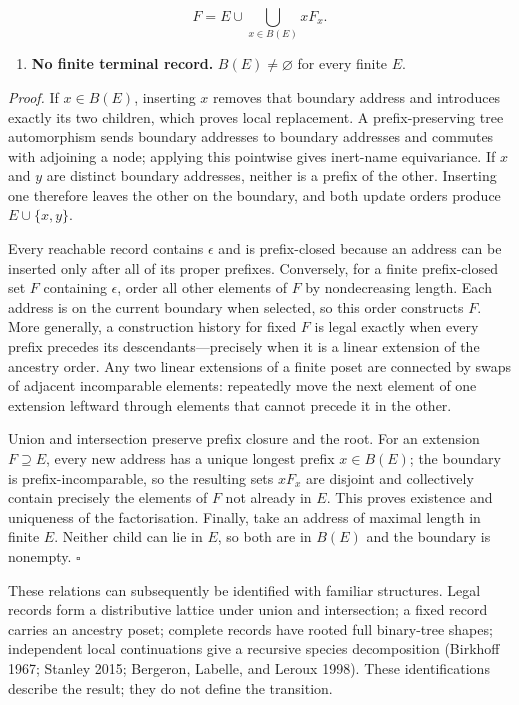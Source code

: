 \documentclass[11pt,a4paper]{article}
\begin{document}
\[F = E \cup \bigcup_{x \in B(E)}xF_{x}.\]

\begin{enumerate}
\def\labelenumi{\arabic{enumi}.}
\setcounter{enumi}{6}
\item
  \textbf{No finite terminal record.} \(B(E) \neq \varnothing\) for
  every finite \(E\).
\end{enumerate}

\emph{Proof.} If \(x \in B(E)\), inserting \(x\) removes that boundary
address and introduces exactly its two children, which proves local
replacement. A prefix-preserving tree automorphism sends boundary
addresses to boundary addresses and commutes with adjoining a node;
applying this pointwise gives inert-name equivariance. If \(x\) and
\(y\) are distinct boundary addresses, neither is a prefix of the other.
Inserting one therefore leaves the other on the boundary, and both
update orders produce \(E \cup \{ x,y\}\).

Every reachable record contains \(\epsilon\) and is prefix-closed
because an address can be inserted only after all of its proper
prefixes. Conversely, for a finite prefix-closed set \(F\) containing
\(\epsilon\), order all other elements of \(F\) by nondecreasing length.
Each address is on the current boundary when selected, so this order
constructs \(F\). More generally, a construction history for fixed \(F\)
is legal exactly when every prefix precedes its descendants---precisely
when it is a linear extension of the ancestry order. Any two linear
extensions of a finite poset are connected by swaps of adjacent
incomparable elements: repeatedly move the next element of one extension
leftward through elements that cannot precede it in the other.

Union and intersection preserve prefix closure and the root. For an
extension \(F \supseteq E\), every new address has a unique longest
prefix \(x \in B(E)\); the boundary is prefix-incomparable, so the
resulting sets \(xF_{x}\) are disjoint and collectively contain
precisely the elements of \(F\) not already in \(E\). This proves
existence and uniqueness of the factorisation. Finally, take an address
of maximal length in finite \(E\). Neither child can lie in \(E\), so
both are in \(B(E)\) and the boundary is nonempty. \(\ensuremath{\square}\)

These relations can subsequently be identified with familiar structures.
Legal records form a distributive lattice under union and intersection;
a fixed record carries an ancestry poset; complete records have rooted
full binary-tree shapes; independent local continuations give a
recursive species decomposition (Birkhoff 1967; Stanley 2015; Bergeron,
Labelle, and Leroux 1998). These identifications describe the result;
they do not define the transition.
\end{document}
